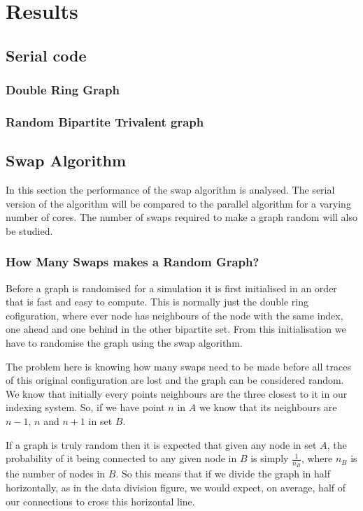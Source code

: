 \documentclass[pdftex,12pt,a4paper]{article}
\begin{document}
\section{Results}

\subsection{Serial code}

\subsubsection{Double Ring Graph}

\subsubsection{Random Bipartite Trivalent graph}

\subsection{Swap Algorithm}

In this section the performance of the swap algorithm is analysed. The serial version of the algorithm will be compared to the parallel algorithm for a varying number of cores. The number of swaps required to make a graph random will also be studied.

\subsubsection{How Many Swaps makes a Random Graph?}

Before a graph is randomised for a simulation it is first initialised in an order that is fast and easy to compute. This is normally just the double ring cofiguration, where ever node has neighbours of the node with the same index, one ahead and one behind in the other bipartite set. From this initialisation we have to randomise the graph using the swap algorithm.

The problem here is knowing how many swaps need to be made before all traces of this original configuration are lost and the graph can be considered random. We know that initially every points neighbours are the three closest to it in our indexing system. So, if we have point $n$ in $A$ we know that its neighbours are $n-1$, $n$ and $n+1$ in set $B$.

If a graph is truly random then it is expected that given any node in set $A$, the probability of it being connected to any given node in $B$ is simply $\frac{1}{n_B}$, where $n_B$ is the number of nodes in $B$. So this means that if we divide the graph in half horizontally, as in the data division figure, we would expect, on average, half of our connections to cross this horizontal line.
\end{document}
